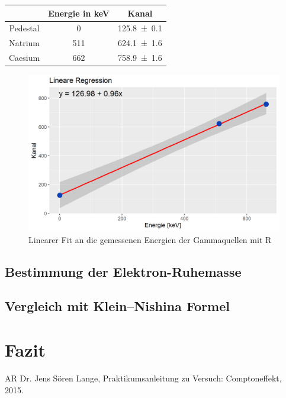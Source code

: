 \documentclass[12pt,a4paper,ngerman]{report}
\begin{document}
			  \begin{tabular}{|c|c|c|}
			  	\hline
			  	& Energie in keV & Kanal \\
			  	\hline
			  	Pedestal & 0 & \num{125.8 +- 0.1} \\
			  	\hline
			  	Natrium & 511 & \num{624.1 +- 1.6} \\
			  	\hline
			  	Caesium & 662 & \num{758.9 +- 1.6} \\
			  	\hline
			  \end{tabular}
			  
			  \begin{figure}
					\centering
					\includegraphics[width=.5\textwidth]{EichLinFit.png}
					\caption{Linearer Fit an die gemessenen Energien der Gammaquellen mit R}
					\label{fig:EichLinFit}
			  \end{figure}

		  \section{Bestimmung der Elektron-Ruhemasse}

		  \section{Vergleich mit Klein–Nishina Formel}



    \chapter{Fazit}

	\listoffigures

	\begin{thebibliography}{111} 
		AR Dr. Jens Sören Lange, \glqq Praktikumsanleitung zu \glq Versuch: Comptoneffekt\grq \grqq{}, 2015.


	\end{thebibliography}
\end{document}
